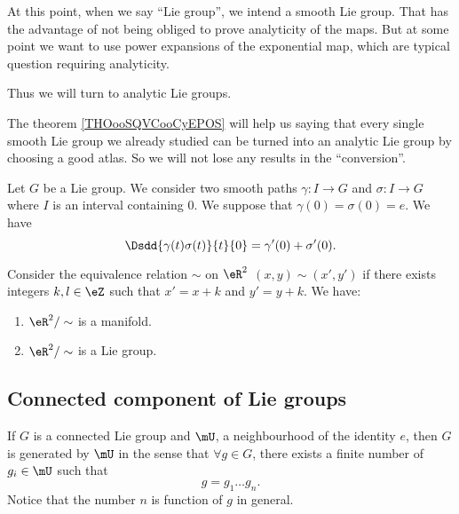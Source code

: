 \begin{normaltext}
	At this point, when we say ``Lie group'', we intend a smooth Lie group. That has the advantage of not being obliged to prove analyticity of the maps. But at some point we want to use power expansions of the exponential map, which are typical question requiring analyticity.

	Thus we will turn to analytic Lie groups.

	The theorem \ref{THOooSQVCooCyEPOS} will help us saying that every single smooth Lie group we already studied can be turned into an analytic Lie group by choosing a good atlas. So we will not lose any results in the ``conversion''.
\end{normaltext}

\begin{proposition}     \label{PROPooAXYRooWVhXRa}
	Let \( G\) be a Lie group. We consider two smooth paths \( \gamma\colon I\to G\) and \( \sigma\colon I\to G\) where \( I\) is an interval containing \( 0\). We suppose that \( \gamma(0)=\sigma(0)=e\). We have
	\begin{equation}
		\Dsdd{ \gamma(t)\sigma(t) }{t}{0}=\gamma'(0)+\sigma'(0).
	\end{equation}
\end{proposition}

\begin{proposition}[\( 2\)-torus]       \label{PROPooSBVCooOZnszF}
	Consider the equivalence relation \( \sim\) on \( \eR^2\) \( (x,y)\sim(x',y')\) if there exists integers \( k,l\in \eZ\) such that \( x'=x+k\) and \( y'=y+k\). We have:
	\begin{enumerate}
		\item
		      \( \eR^2/\sim\) is a manifold.
		\item
		      \( \eR^2/\sim\) is a Lie group.
	\end{enumerate}
\end{proposition}
\subsection{Connected component of Lie groups}

\begin{proposition}		\label{PropUssGpGenere}
	If $G$ is a connected Lie group and $\mU$, a neighbourhood of the identity $e$, then $G$ is generated by $\mU$ in the sense that $\forall g\in G$, there exists a finite number of $g_{i}\in \mU$ such that
	\begin{equation}
		g=g_1\ldots g_n.
	\end{equation}
	Notice that the number $n$ is function of $g$ in general.
\end{proposition}

